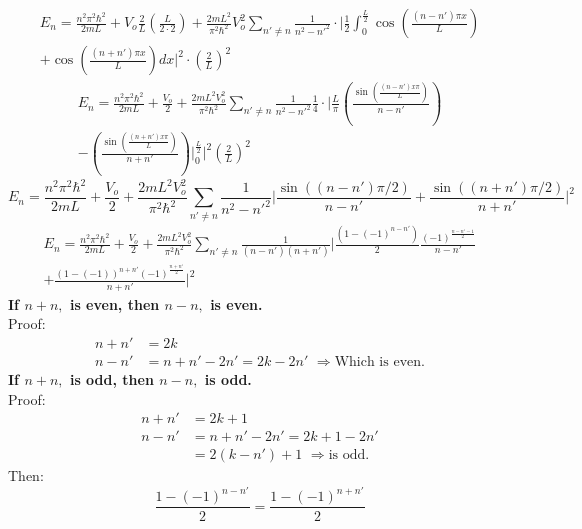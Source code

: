\documentclass[12pt,fancychapters]{report}
\numberwithin{equation}{section}
\begin{document}
\begin{multline*}
	E_n = \frac{n^2 \pi^2 \hbar^2}{2mL} +V_o \frac{2}{L} \left(\frac{L}{2\cdot 2}\right) + \frac{2mL^2}
	{\pi^2 \hbar^2}V_o^2 \sum_{n'\neq n} \frac{1}{n^2 - n'^2}\cdot \bigg| \frac{1}{2}\int_{0}^
	{\frac{L}{2}} \cos \left(\frac{(n-n')\pi x}{L}\right)\\
	+ \cos \left(\frac{(n+n')\pi x}{L}\right)dx \bigg|^2\cdot \left(\frac{2}{L}\right)^2
\end{multline*}
\begin{multline*}
	E_n = \frac{n^2 \pi^2 \hbar^2}{2mL} + \frac{V_o}{2} + \frac{2mL^2 V^2_o}{\pi^2 \hbar^2}\sum_{n'\neq n}
	\frac{1}{n^2 - n'^2}\frac{1}{4}\cdot \Bigg|\frac{L}{\pi}\left(\frac{\sin\left(\frac{(n-n')x\pi}{L}\right)}
	{n-n'}\right)\\
	-\left(\frac{\sin\left(\frac{(n+n')x\pi}{L}\right)}{n+n'}\right)\Bigg|_{0}^{\frac{L}{2}}\Bigg|^2
\left(\frac{2}{L}\right)^2
\end{multline*}
\begin{equation*}
 E_n = \frac{n^2 \pi^2 \hbar^2}{2mL} + \frac{V_o}{2} + \frac{2mL^2 V^2_o}{\pi^2 \hbar^2}\sum_{n'\neq n}
 \frac{1}{n^2-n'^2}\Bigg|\frac{\sin((n-n')\pi/2)}{n-n'} +\frac{\sin((n+n')\pi/2)}{n+n'}\Bigg|^2
\end{equation*}
\begin{multline*}
 E_n = \frac{n^2 \pi^2 \hbar^2}{2mL} +\frac{V_o}{2} + \frac{2mL^2 V^2_o}{\pi^2 \hbar^2}\sum_{n'\neq n}
 \frac{1}{(n-n')(n+n')}\Bigg|\frac{(1-(-1)^{n-n'})}{2}\frac{(-1)^{\frac{n-n'-1}{2}}}{n-n'}\\
 + \frac{(1-(-1))^{n+n'}(-1)^{\frac{n+n'}{2}}}{n+n'} \Bigg|^2
\end{multline*}
\textbf{If $n+n,$ is even, then $n-n,$ is even.}\\
Proof:
\begin{align*}
	n+n' & = 2k\\
	n-n' & = n+n' -2n'=2k -2n'\,\,\Longrightarrow\text{Which is even.}
\end{align*}
\textbf{If $n+n,$ is odd, then $n-n,$ is odd.}\\
Proof:
\begin{align*}
	n+n' & = 2k + 1\\
	n-n' & = n+n'-2n' = 2k+1-2n'\\
	& = 2(k - n') + 1\,\,\Longrightarrow \text{is odd.}
\end{align*}
Then:
\begin{equation*}
	\frac{1-(-1)^{n-n'}}{2} = \frac{1-(-1)^{n+n'}}{2}
\end{equation*}
\end{document}
